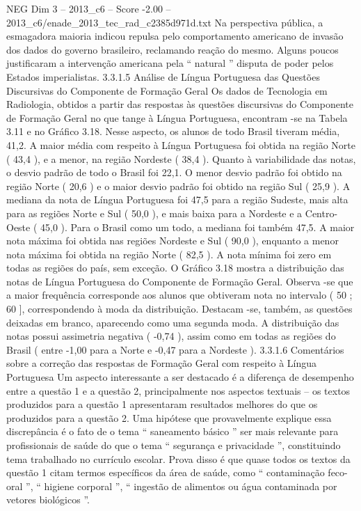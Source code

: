 \begin{textsample}{NEG Dim 3 – 2013\_c6 – Score -2.00 – 2013\_c6/enade\_2013\_tec\_rad\_c2385d971d.txt}
Na perspectiva pública, a esmagadora maioria indicou repulsa pelo comportamento americano de invasão dos dados do governo brasileiro, reclamando reação do mesmo.
Alguns poucos justificaram a intervenção americana pela “ natural ” disputa de poder pelos Estados imperialistas. 3.3.1.5 Análise de Língua Portuguesa das Questões Discursivas do Componente de Formação Geral Os dados de Tecnologia em Radiologia, obtidos a partir das respostas às questões discursivas do Componente de Formação Geral no que tange à Língua Portuguesa, encontram -se na Tabela 3.11 e no Gráfico 3.18.
Nesse aspecto, os alunos de todo Brasil tiveram média, 41,2.
A maior média com respeito à Língua Portuguesa foi obtida na região Norte ( 43,4 ), e a menor, na região Nordeste ( 38,4 ).
Quanto à variabilidade das notas, o desvio padrão de todo o Brasil foi 22,1.
O menor desvio padrão foi obtido na região Norte ( 20,6 ) e o maior desvio padrão foi obtido na região Sul ( 25,9 ).
A mediana da nota de Língua Portuguesa foi 47,5 para a região Sudeste, mais alta para as regiões Norte e Sul ( 50,0 ), e mais baixa para a Nordeste e a Centro-Oeste ( 45,0 ).
Para o Brasil como um todo, a mediana foi também 47,5.
A maior nota máxima foi obtida nas regiões Nordeste e Sul ( 90,0 ), enquanto a menor nota máxima foi obtida na região Norte ( 82,5 ).
A nota mínima foi zero em todas as regiões do país, sem exceção.
O Gráfico 3.18 mostra a distribuição das notas de Língua Portuguesa do Componente de Formação Geral.
Observa -se que a maior frequência corresponde aos alunos que obtiveram nota no intervalo ( 50 ; 60 ], correspondendo à moda da distribuição.
Destacam -se, também, as questões deixadas em branco, aparecendo como uma segunda moda.
A distribuição das notas possui assimetria negativa ( -0,74 ), assim como em todas as regiões do Brasil ( entre -1,00 para a Norte e -0,47 para a Nordeste ). 3.3.1.6 Comentários sobre a correção das respostas de Formação Geral com respeito à Língua Portuguesa Um aspecto interessante a ser destacado é a diferença de desempenho entre a questão 1 e a questão 2, principalmente nos aspectos textuais – os textos produzidos para a questão 1 apresentaram resultados melhores do que os produzidos para a questão 2.
Uma hipótese que provavelmente explique essa discrepância é o fato de o tema “ saneamento básico ” ser mais relevante para profissionais de saúde do que o tema “ segurança e privacidade ”, constituindo tema trabalhado no currículo escolar.
Prova disso é que quase todos os textos da questão 1 citam termos específicos da área de saúde, como “ contaminação feco-oral ”, “ higiene corporal ”, “ ingestão de alimentos ou água contaminada por vetores biológicos ”.

\end{textsample}
